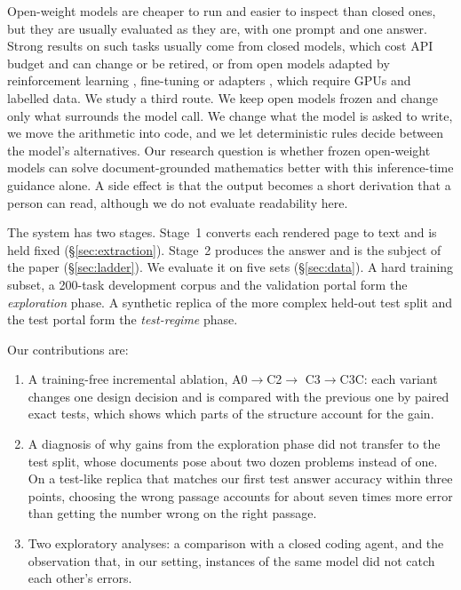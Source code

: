 \documentclass[11pt]{article}%
\begin{document}
Open-weight models are cheaper to run and easier to inspect than closed ones,
but they are usually evaluated as they are, with one prompt and one answer.
Strong results on such tasks usually come from closed models, which cost API
budget and can change or be retired, or from open models adapted by
reinforcement learning \citep{deepseek2025r1}, fine-tuning or adapters
\citep{hu2022lora}, which require GPUs and labelled data. We study a third route. We keep open models frozen and change only
what surrounds the model call. We change what the model is asked to write, we
move the arithmetic into code, and we let deterministic rules decide between
the model's alternatives. Our research question is whether frozen open-weight
models can solve document-grounded mathematics better with this inference-time
guidance alone. A side effect is that the output becomes a short
derivation that a person can read, although we do not evaluate readability
here.

The system has two stages. Stage~1 converts each rendered page to text and is
held fixed (\S\ref{sec:extraction}). Stage~2 produces the answer and is the subject of the paper (\S\ref{sec:ladder}). We evaluate it on five sets
(\S\ref{sec:data}). A hard training subset, a 200-task development corpus and
the validation portal form the \emph{exploration} phase. A synthetic replica of
the more complex held-out test split and the test portal form the
\emph{test-regime} phase.

Our contributions are:
\begin{enumerate}
\item A training-free incremental ablation, \textsc{A0}$\rightarrow$\textsc{C2}$\rightarrow$%
      \textsc{C3}$\rightarrow$\textsc{C3C}: each variant changes one design
      decision and is compared with the previous one by paired exact tests,
      which shows which parts of the structure account for the gain.
\item A diagnosis of why gains from the exploration phase did not transfer
      to the test split, whose documents pose about two dozen problems instead
      of one. On a test-like replica that matches our first test answer accuracy
      within three points, choosing the wrong passage accounts for about seven
      times more error than getting the number wrong on the right passage.
\item Two exploratory analyses: a comparison with a closed coding agent, and
      the observation that, in our setting, instances of the same model did not catch each
      other's errors.
\end{enumerate}
\end{document}

